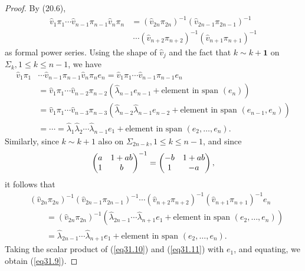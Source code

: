 \documentclass{surv-l}
\theoremstyle{plain}
\theoremstyle{definition}
\numberwithin{equation}{chapter}
\begin{document}
\begin{proof}
By (20.6),
\begin{align*}
\hat{v}_{1}\pi_{1}\cdots\hat{v}_{n-1}\pi_{n-1}\hat{v}_{n}\pi_{n}&=(\hat{v}_{2n}\pi_{2n})^{-1}(\hat{v}_{2n-1}\pi_{2n-1})^{-1}\\
&\ \cdots(\hat{v}_{n+2}\pi_{n+2})^{-1}(\hat{v}_{n+1}\pi_{n+1})^{-1}
\end{align*}
as formal power series. Using the shape of $\hat{v}_{j}$ and the fact that $k\sim k+\mathbf{1}$ on $\Sigma_{k}, 1\leq k\leq n-1$, we have
\begin{align}\label{eq31.10}
\hat{v}_{1}\pi_{1}&\cdots \hat{v}_{n-1}\pi_{n-1}\hat{v}_{n}\pi_{n}e_{n}=\hat{v}_{1}\pi_{1}\cdots\hat{v}_{n-1}\pi_{n-1}e_{n}\\ \nonumber
&=\hat{v}_{1}\pi_{1}\cdots\hat{v}_{n-2}\pi_{n-2}(\hat{\lambda}_{n-1}e_{n-1}+\text{element in span }(e_{n}))\\ \nonumber
&=\hat{v}_{1}\pi_{1}\cdots \hat{v}_{n-3}\pi_{ n-3}(\hat{\lambda}_{n-2}\hat{\lambda}_{n-1}e_{n-2}+\text{element in span }(e_{n-1}, e_{n}))\\ \nonumber
&=\cdots =\hat{\lambda}_{1}\hat{\lambda}_{2}\cdots \hat{\lambda}_{n-1}e_{1}+ \text{element in span } (e_{2}, \ldots, e_{n}).
\end{align}
Similarly, since $k\sim k+1$ also on ${\Sigma}_{2n-k}, 1\leq k\leq n-1$, and since
\begin{equation*}
\left(\begin{array}{@{}cc@{}}
a & 1+ab\\
1 & b
\end{array}\right)^{-1}=\left(\begin{array}{@{}cc@{}}
-b & 1+ab\\
1 & -a
\end{array}\right),
\end{equation*}
it follows that
\begin{align}\label{eq31.11}
&(\hat{v}_{2n}\pi_{2n})^{-1}(\hat{v}_{2n-1}\pi_{2n-1})^{-1}\cdots (\hat{v}_{n+2}\pi_{n+2})^{-1}(\hat{v}_{n+1}\pi_{n+1})^{-1}e_{n}\\ \nonumber
&\qquad=(\hat{v}_{2n}\pi_{2n})^{-1}(\hat{\lambda}_{2n-1}\cdots \hat{\lambda}_{n+1}e_{1}+ \text{element in span } (e_{2}, \ldots, e_{n}))\\ \nonumber
&\qquad=\hat{\lambda}_{2n-1}\cdots \hat{\lambda}_{n+1}e_{1}+ \text{element in span }(e_{2},\ldots,e_{n}).
\end{align}
Taking the scalar product of (\ref{eq31.10}) and (\ref{eq31.11}) with $e_{1}$, and equating, we obtain (\ref{eq31.9}).\quad
\end{proof}
\end{document}

